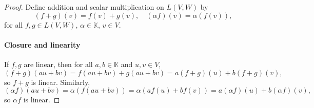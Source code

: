 \begin{solution}\leavevmode
  \begin{enumext}
    \item \begin{proof}
    Define addition and scalar multiplication on $L(V,W)$ by
    \[
      (f + g)(v) = f(v) + g(v), \quad (\alpha f)(v) = \alpha (f(v)),
    \]
    for all $f,g \in L(V,W)$, $\alpha \in \mathbb{K}$, $v \in V$.
    \paragraph{Closure and linearity}
    If $f, g$ are linear, then for all $a,b \in \mathbb{K}$ and $u,v \in V$,
      \[
      (f+g)(a u + b v) = f(a u + b v) + g(a u + b v)
    = a (f + g)(u) + b (f + g)(v),
      \]
      so $f + g$ is linear. Similarly,
      \[
        (\alpha f)(a u + b v) = \alpha (f(a u + b v)) = \alpha (a f(u) + b f(v))
      = a (\alpha f)(u) + b (\alpha f)(v),
      \]
      so $\alpha f$ is linear.

\end{proof}
\end{enumext}
\end{solution}
